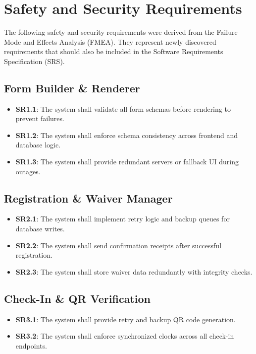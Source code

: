 \documentclass[12pt]{article}
\begin{document}
\section{Safety and Security Requirements}

The following safety and security requirements were derived from the Failure Mode and Effects Analysis (FMEA).
They represent newly discovered requirements that should also be included in the Software Requirements Specification (SRS).

\subsection{Form Builder \& Renderer}
\begin{itemize}
    \item \textbf{SR1.1}: The system shall validate all form schemas before rendering to prevent failures.
    \item \textbf{SR1.2}: The system shall enforce schema consistency across frontend and database logic.
    \item \textbf{SR1.3}: The system shall provide redundant servers or fallback UI during outages.
\end{itemize}

\subsection{Registration \& Waiver Manager}
\begin{itemize}
    \item \textbf{SR2.1}: The system shall implement retry logic and backup queues for database writes.
    \item \textbf{SR2.2}: The system shall send confirmation receipts after successful registration.
    \item \textbf{SR2.3}: The system shall store waiver data redundantly with integrity checks.
\end{itemize}

\subsection{Check-In \& QR Verification}
\begin{itemize}
    \item \textbf{SR3.1}: The system shall provide retry and backup QR code generation.
    \item \textbf{SR3.2}: The system shall enforce synchronized clocks across all check-in endpoints.
\end{itemize}
\end{document}

